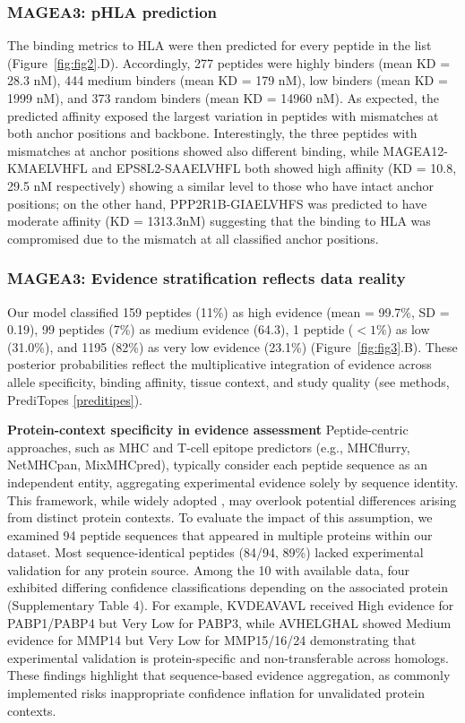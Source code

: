 \documentclass[unnumsec,webpdf,contemporary,large]{oup-authoring-template}%
\theoremstyle{thmstyleone}%
\theoremstyle{thmstyletwo}%
\theoremstyle{thmstylethree}%
\begin{document}
        \subsubsection{\textbf{MAGEA3: pHLA prediction}}
            The binding metrics to HLA were then predicted for every peptide in the list (Figure~\ref{fig:fig2}.D). Accordingly, 277 peptides were highly binders (mean KD = 28.3 nM), 444 medium binders (mean KD = 179 nM), low binders (mean KD = 1999 nM), and 373 random binders (mean KD = 14960 nM). As expected, the predicted affinity exposed the largest variation in peptides with mismatches at both anchor positions and backbone. Interestingly, the three peptides with mismatches at anchor positions showed also different binding, while MAGEA12-KMAELVHFL and EPS8L2-SAAELVHFL both showed high affinity (KD = 10.8, 29.5 nM respectively) showing a similar level to those who have intact anchor positions; on the other hand, PPP2R1B-GIAELVHFS was predicted to have moderate affinity (KD = 1313.3nM) suggesting that the binding to HLA was compromised due to the mismatch at all classified anchor positions.

        
        \subsubsection{\textbf{MAGEA3: Evidence stratification reflects data reality}}

        Our model classified 159 peptides (11\%) as high evidence (mean = 99.7\%, SD = 0.19), 99 peptides (7\%) as medium evidence (64.3), 1 peptide ($< 1\%$) as low (31.0\%), and 1195 (82\%) as very low evidence (23.1\%) (Figure~\ref{fig:fig3}.B). These posterior probabilities reflect the multiplicative integration of evidence across allele specificity, binding affinity, tissue context, and study quality (see methods, PrediTopes \ref{preditipes}). 
   
        \textbf{Protein-context specificity in evidence assessment}
        Peptide-centric approaches, such as MHC and T-cell epitope predictors (e.g., MHCflurry, NetMHCpan, MixMHCpred), typically consider each peptide sequence as an independent entity, aggregating experimental evidence solely by sequence identity. This framework, while widely adopted \cite{gfeller2023contemplating, reynisson2020netmhcpan}, may overlook potential differences arising from distinct protein contexts. To evaluate the impact of this assumption, we examined 94 peptide sequences that appeared in multiple proteins within our dataset. Most sequence-identical peptides (84/94, 89\%) lacked experimental validation for any protein source. Among the 10 with available data, four exhibited differing confidence classifications depending on the associated protein (Supplementary Table 4).
        For example, KVDEAVAVL received High evidence for PABP1/PABP4 but Very Low for PABP3, while AVHELGHAL showed Medium evidence for MMP14 but Very Low for MMP15/16/24 demonstrating that experimental validation is protein-specific and non-transferable across homologs.
        These findings highlight that sequence-based evidence aggregation, as commonly implemented risks inappropriate confidence inflation for unvalidated protein contexts.
        
\end{document}
